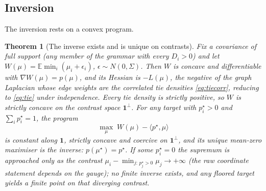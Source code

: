 \documentclass[11pt]{article}
\newtheorem{theorem}{Theorem}
\newcommand{\E}{\mathbb{E}}
\begin{document}
\subsection{Inversion}

The inversion rests on a convex program.

\begin{theorem}[The inverse exists and is unique on contrasts]\label{thm:inverse}
Fix a covariance of full support (any member of the grammar with every
$D_i>0$) and let $W(\mu)=\E\min_i(\mu_i+\epsilon_i)$,
$\epsilon\sim N(0,\Sigma)$. Then $W$ is concave and differentiable with
$\nabla W(\mu)=p(\mu)$, and its Hessian is $-L(\mu)$, the negative of the
graph Laplacian whose edge weights are the correlated tie densities
\eqref{eq:tiecorr}, reducing to \eqref{eq:tie} under independence.
Every tie density is strictly positive, so $W$ is strictly concave on the
contrast space $\mathbf{1}^{\perp}$. For any target with $p^{\star}_i>0$
and $\sum_i p^{\star}_i=1$, the program
\[
\max_{\mu}\; W(\mu)-\langle p^{\star},\mu\rangle
\]
is constant along $\mathbf{1}$, strictly concave and coercive on
$\mathbf{1}^{\perp}$, and its unique mean-zero maximiser is the inverse:
$p(\mu^{\star})=p^{\star}$. If some $p^{\star}_i=0$ the supremum is
approached only as the contrast
$\mu_i-\min_{j:\,p^{\star}_j>0}\mu_j\to+\infty$ (the raw coordinate
statement depends on the gauge); no finite inverse exists, and any
floored target yields a finite point on that diverging contrast.
\end{theorem}
\end{document}
